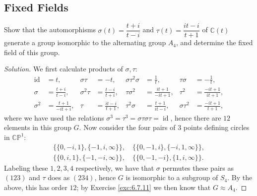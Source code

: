 \documentclass[12pt]{article}
\theoremstyle{remark}
\DeclareMathOperator{\id}{id}
\newcommand{\PGL}{\mathit{PGL}}
\begin{document}
\subsection{Fixed Fields}
\setcounter{subsubsection}{1}
\begin{problem}
  Show that the automorphisms $\sigma(t) = \dfrac{t+i}{t-i}$ and $\tau(t) = \dfrac{it - i}{t+1}$ of $\mathbb{C}(t)$ generate a group isomorphic to the alternating group $A_4$, and determine the fixed field of this group.
\end{problem}
\begin{proof}[Solution]
  We first calculate products of $\sigma,\tau$:
  \begin{equation}\label{eq:16.5.2}
    \begin{aligned}
      \id          &= t, & 
      \sigma\tau   &= -t, &
      \sigma\tau^2\sigma &= \frac{1}{t}, &
      \tau\sigma   &= -\frac{1}{t},\\
      \sigma       &= \frac{t+i}{t-i}, &
      \sigma^2\tau &= \frac{t-i}{t+i}, &
      \tau\sigma^2 &= \frac{it+1}{-it+1},&
      \tau^2       &= \frac{-it+1}{it+1},\\
      \sigma^2     &= \frac{t+1}{-it+i}, &
      \tau         &= \frac{it - i}{t+1}, &
      \tau^2\sigma &= \frac{t+1}{it-i}, &
      \sigma\tau^2 &= \frac{-it+1}{t+1},
    \end{aligned}
  \end{equation}
  where we have used the relations $\sigma^3 = \tau^3 = \sigma\tau\sigma\tau = \id$, hence there are $12$ elements in this group $G$. Now consider the four pairs of $3$ points defining circles in $\mathbb{CP}^1$:
  \begin{gather*}
    \{\{0,-i,1\},\{-1,i,\infty\}\}, \quad \{\{0,-1,i\},\{-i,1,\infty\}\},\\
    \{\{0,i,1\},\{-1,-i,\infty\}\}, \quad \{\{0,-1,-i\},\{1,i,\infty\}\}.
  \end{gather*}
  Labeling these $1,2,3,4$ respectively, we have that $\sigma$ permutes these pairs as $(123)$ and $\tau$ does as $(234)$, hence $G$ is isomorphic to a subgroup of $S_4$. By the above, this has order $12$; by Exercise \ref{exc:6.7.11} we then know that $G \approx A_4$.

\end{proof}
\end{document}
